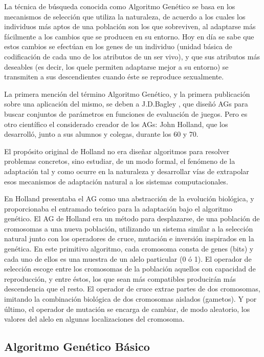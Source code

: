\documentclass[runningheads]{llncs}
\begin{document}
La técnica de búsqueda conocida como Algoritmo Genético se basa en los mecanismos de selección que utiliza la naturaleza, 
de acuerdo a los cuales los individuos más aptos de una población son los que sobreviven, al adaptarse más
fácilmente a los cambios que se producen en su entorno. Hoy en día se sabe que estos cambios se efectúan en los genes de 
un individuo (unidad básica de codificación de cada uno de los atributos de un ser vivo), 
y que sus atributos más deseables (es decir, los quele permiten adaptarse mejor a su entorno) se transmiten a sus descendientes 
cuando éste se reproduce sexualmente. 

La primera mención del término Algoritmo Genético, y la primera publicación
sobre una aplicación del mismo, se deben a J.D.Bagley \cite{Bagley67}, que diseñó AGs para
buscar conjuntos de parámetros en funciones de evaluación de juegos. 
Pero es otro científico el considerado creador de los AGs: John Holland, que los desarrolló, junto a sus alumnos y colegas, 
durante los 60 y 70.  

El propósito original de Holland no era diseñar algoritmos para resolver problemas concretos, sino estudiar, de un modo formal, 
el fenómeno de la adaptación tal y como ocurre en la naturaleza y desarrollar vías de extrapolar esos mecanismos de adaptación
natural a los sistemas computacionales.  

En \cite{Holland75} Holland presentaba el AG como una
abstracción de la evolución biológica, y proporcionaba el entramado teórico para la adaptación bajo el algoritmo genético. 
El AG de Holland era un método para desplazarse, de una población de cromosomas a una nueva población, utilizando
un sistema similar a la selección natural junto con los operadores de cruce, mutación e inversión inspirados en la genética. 
En este primitivo algoritmo, cada cromosoma consta de genes (bits) y cada uno de ellos es una muestra de un alelo particular (0 ó 1). 
El operador de selección escoge entre los cromosomas de la población aquellos con capacidad de reproducción, y entre éstos, 
los que sean más compatibles producirán más descendencia que el resto. El operador de cruce extrae partes de dos cromosomas,
imitando la combinación biológica de dos cromosomas aislados (gametos). Y por último, el operador de mutación se encarga de cambiar, 
de modo aleatorio, los valores del alelo en algunas localizaciones del cromosoma. 






\subsection{Algoritmo Genético Básico}
\end{document}

